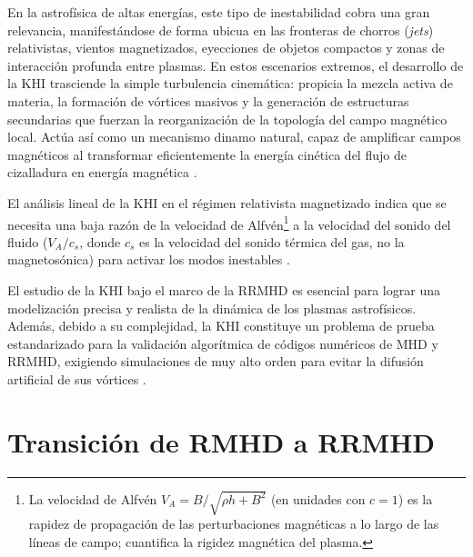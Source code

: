 En la astrofísica de altas energías, este tipo de inestabilidad cobra una gran relevancia, manifestándose de forma ubicua en las fronteras de chorros (\textit{jets}) relativistas, vientos magnetizados, eyecciones de objetos compactos y zonas de interacción profunda entre plasmas. En estos escenarios extremos, el desarrollo de la KHI trasciende la simple turbulencia cinemática: propicia la mezcla activa de materia, la formación de vórtices masivos y la generación de estructuras secundarias que fuerzan la reorganización de la topología del campo magnético local. Actúa así como un mecanismo dinamo natural, capaz de amplificar campos magnéticos al transformar eficientemente la energía cinética del flujo de cizalladura en energía magnética \parencite{pimentel-2019}.

El análisis lineal de la KHI en el régimen relativista magnetizado indica que se necesita una baja razón de la velocidad de Alfvén\footnote{La velocidad de Alfvén $V_A=B/\sqrt{\rho h+B^2}$ (en unidades con $c=1$) es la rapidez de propagación de las perturbaciones magnéticas a lo largo de las líneas de campo; cuantifica la rigidez magnética del plasma.} a la velocidad del sonido del fluido ($V_A/c_s$, donde $c_s$ es la velocidad del sonido térmica del gas, no la magnetosónica) para activar los modos inestables \parencite{osmanov-2008}. 

El estudio de la KHI bajo el marco de la RRMHD es esencial para lograr una modelización precisa y realista de la dinámica de los plasmas astrofísicos. Además, debido a su complejidad, la KHI constituye un problema de prueba estandarizado para la validación algorítmica de códigos numéricos de MHD y RRMHD, exigiendo simulaciones de muy alto orden para evitar la difusión artificial de sus vórtices \parencite{gomes-2017}.

\section{Transición de RMHD a RRMHD}

